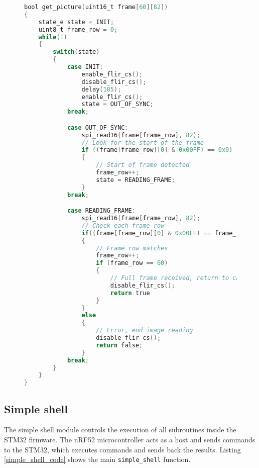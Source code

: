 \clearpage
\lstset{style=mystyle}
\begin{figure}[ht]
\begin{lstlisting}[language=C]
bool get_picture(uint16_t frame[60][82])
{
    state_e state = INIT;
    uint8_t frame_row = 0;
    while(1) 
    {
        switch(state) 
        {
            case INIT:
                enable_flir_cs();
                disable_flir_cs();
                delay(185);
                enable_flir_cs();
                state = OUT_OF_SYNC;
            break;

            case OUT_OF_SYNC:
                spi_read16(frame[frame_row], 82);
                // Look for the start of the frame
                if ((frame[frame_row][0] & 0x00FF) == 0x0) 
                {
                    // Start of frame detected
                    frame_row++;
                    state = READING_FRAME;
                }
            break;

            case READING_FRAME:
                spi_read16(frame[frame_row], 82);
                // Check each frame row
                if((frame[frame_row][0] & 0x00FF) == frame_row) 
                {
                    // Frame row matches
                    frame_row++;
                    if (frame_row == 60) 
                    {
                        // Full frame received, return to caller
                        disable_flir_cs();
                        return true
                    }
                }
                else 
                {
                    // Error, end image reading
                    disable_flir_cs();
                    return false;
                }
            break;
        }
    }
}
\end{lstlisting}
\label{vospi_code}
\end{figure}
\clearpage
\subsection{ Simple shell}

The simple shell module controls the execution of all subroutines inside the STM32 firmware.
The nRF52 microcontroller acts as a host and sends commands to the STM32, which executes commands and sends back the results.
Listing \ref{simple_shell_code} shows the main \verb|simple_shell| function.

